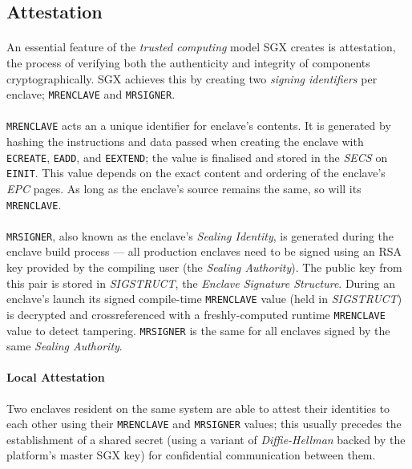 \subsection{Attestation}
\label{sec:attestation}

\paragraph{} An essential feature of the \textit{trusted computing} model SGX creates is attestation, the process of verifying both the authenticity and integrity of components cryptographically. SGX achieves this by creating two \textit{signing identifiers} per enclave; \texttt{MRENCLAVE} and \texttt{MRSIGNER}.~\cite{Anati2013InnovativeTF,sgx-prov-service}

\paragraph{} \texttt{MRENCLAVE} acts an a unique identifier for enclave's contents. It is generated by hashing the instructions and data passed when creating the enclave with \texttt{ECREATE}, \texttt{EADD}, and \texttt{EEXTEND}; the value is finalised and stored in the \textit{SECS} on \texttt{EINIT}. This value depends on the exact content and ordering of the enclave's \textit{EPC} pages. As long as the enclave's source remains the same, so will its \texttt{MRENCLAVE}.

\paragraph{} \texttt{MRSIGNER}, also known as the enclave's \textit{Sealing Identity}, is generated during the enclave build process --- all production enclaves need to be signed using an RSA key provided by the compiling user (the \textit{Sealing Authority}). The public key from this pair is stored in \textit{SIGSTRUCT}, the \textit{Enclave Signature Structure}. During an enclave's launch its signed compile-time \texttt{MRENCLAVE} value (held in \textit{SIGSTRUCT}) is decrypted and crossreferenced with a freshly-computed runtime \texttt{MRENCLAVE} value to detect tampering. \texttt{MRSIGNER} is the same for all enclaves signed by the same \textit{Sealing Authority}.

\paragraph{Local Attestation} Two enclaves resident on the same system are able to attest their identities to each other using their \texttt{MRENCLAVE} and \texttt{MRSIGNER} values; this usually precedes the establishment of a shared secret (using a variant of \textit{Diffie-Hellman} backed by the platform's master SGX key) for confidential communication between them.

